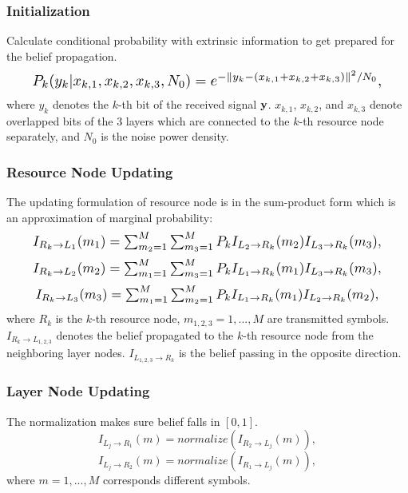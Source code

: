 \documentclass[journal,twoside]{IEEEtran}
\begin{document}
\subsubsection{Initialization}
Calculate conditional probability with extrinsic information to get prepared for the belief propagation.
\begin{equation}
\resizebox{.91\linewidth}{!}{$
\label{eqn:2}
P_{k}(y_{k}|x_{k,1},x_{k,2},x_{k,3},N_{0}) = e^{-\parallel y_{k}-(x_{k,1}+x_{k,2}+x_{k,3})\parallel^{2}/N_{0}},
$}
\end{equation}
where $y_{k}$ denotes the $k$-th bit of the received signal ${\bf{y}}$. $x_{k,1}$, $x_{k,2}$, and $x_{k,3}$ denote overlapped bits of the $3$ layers which are connected to the $k$-th resource node separately, and $N_{0}$ is the noise power density.

\subsubsection{Resource Node Updating}
The updating formulation of resource node is in the sum-product form which is an approximation of marginal probability:
\begin{equation}
\label{eqn:3}
\resizebox{.91\linewidth}{!}{$
I_{R_{k}\rightarrow L_{1}}(m_{1}) = \sum^{M}_{m_{2}=1}\sum^{M}_{m_{3}=1}P_{k}I_{L_{2}\rightarrow R_{k}}(m_{2})I_{L_{3}\rightarrow R_{k}}(m_{3}),
$}
\end{equation}
\begin{equation}
\label{eqn:4}
\resizebox{.91\linewidth}{!}{$
I_{R_{k}\rightarrow L_{2}}(m_{2}) = \sum^{M}_{m_{1}=1}\sum^{M}_{m_{3}=1}P_{k}I_{L_{1}\rightarrow R_{k}}(m_{1})I_{L_{3}\rightarrow R_{k}}(m_{3}),
$}
\end{equation}
\begin{equation}
\label{eqn:5}
\resizebox{.89\linewidth}{!}{$
I_{R_{k}\rightarrow L_{3}}(m_{3}) = \sum^{M}_{m_{1}=1}\sum^{M}_{m_{2}=1}P_{k}I_{L_{1}\rightarrow R_{k}}(m_{1})I_{L_{2}\rightarrow R_{k}}(m_{2}),
$}
\end{equation}
where $R_{k}$ is the $k$-th resource node, $m_{1,2,3} = 1,...,M$ are transmitted symbols. $I_{R_{k}\rightarrow L_{1,2,3}}$ denotes the belief propagated to the $k$-th resource node from the neighboring layer nodes. $I_{L_{1,2,3}\rightarrow R_{k}}$ is the belief passing in the opposite direction.

\subsubsection{Layer Node Updating}
The normalization makes sure belief falls in $[0,1]$.
\begin{equation}
\label{eqn:6}
I_{L_{j}\rightarrow R_{1}}(m) = normalize(I_{R_{2}\rightarrow L_{j}}(m)),
\end{equation}
\begin{equation}
\label{eqn:7}
I_{L_{j}\rightarrow R_{2}}(m) = normalize(I_{R_{1}\rightarrow L_{j}}(m)),
\end{equation}
where $m = 1,...,M$ corresponds different symbols.
\end{document}

